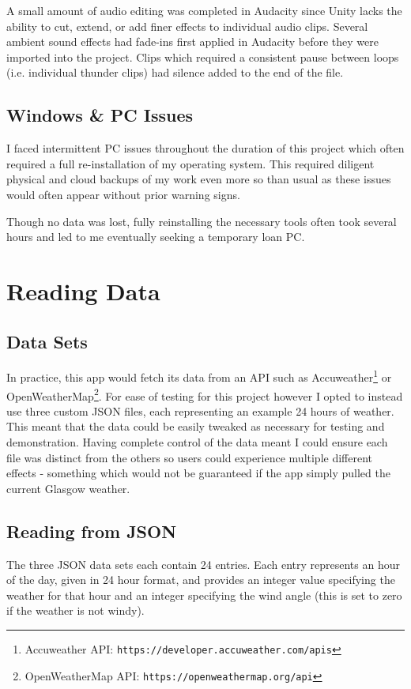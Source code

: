 \documentclass{l4proj}
\begin{document}
A small amount of audio editing was completed in Audacity since Unity lacks the ability to cut, extend, or add finer effects to individual audio clips. Several ambient sound effects had fade-ins first applied in Audacity before they were imported into the project. Clips which required a consistent pause between loops (i.e. individual thunder clips) had silence added to the end of the file.

\subsection{Windows \& PC Issues} I faced intermittent PC issues throughout the duration of this project which often required a full re-installation of my operating system. This required diligent physical and cloud backups of my work even more so than usual as these issues would often appear without prior warning signs.

Though no data was lost, fully reinstalling the necessary tools often took several hours and led to me eventually seeking a temporary loan PC.

\section{Reading Data}
\subsection{Data Sets}
In practice, this app would fetch its data from an API such as Accuweather\footnote{Accuweather API: \texttt{https://developer.accuweather.com/apis}} or OpenWeatherMap\footnote{OpenWeatherMap API: \texttt{https://openweathermap.org/api}}. For ease of testing for this project however I opted to instead use three custom JSON files, each representing an example 24 hours of weather. This meant that the data could be easily tweaked as necessary for testing and demonstration. Having complete control of the data meant I could ensure each file was distinct from the others so users could experience multiple different effects - something which would not be guaranteed if the app simply pulled the current Glasgow weather.

\subsection{Reading from JSON}

The three JSON data sets each contain 24 entries. Each entry represents an hour of the day, given in 24 hour format, and provides an integer value specifying the weather for that hour and an integer specifying the wind angle (this is set to zero if the weather is not windy).
\end{document}
